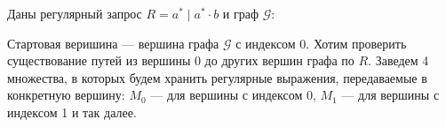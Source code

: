 \begin{example}
Даны регулярный запрос $R = a^* \mid a^* \cdot b$ и граф $\mathcal{G}$:
    
    \begin{center}
    \end{center}

Стартовая веришина --- вершина графа $\mathcal{G}$ с индексом 0. Хотим проверить существование путей из вершины 0 до других вершин графа по $R$. Заведем 4 множества, в которых будем хранить регулярные выражения, передаваемые в конкретную вершину: $M_{0}$ --- для вершины с индексом 0, $M_{1}$ --- для вершины с индексом 1 и так далее. 


\end{example}
